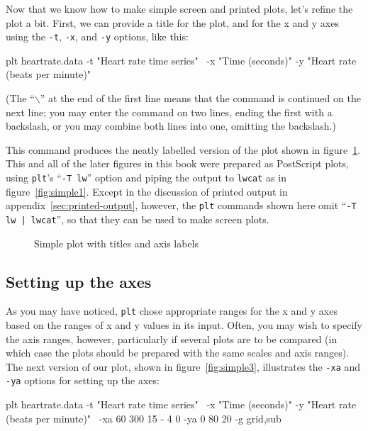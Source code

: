 \documentclass{book}
\begin{document}
Now that we know how to make simple screen and printed plots, let's
refine the plot a bit.  First, we can provide a title for the plot,
and for the x and y axes using the {\tt -t}, {\tt -x}, and {\tt -y}
options, like this:

\begin{center}
\begin{boxedverbatim}
plt heartrate.data -t "Heart rate time series" \
  -x "Time (seconds)" -y "Heart rate (beats per minute)"
\end{boxedverbatim}
\end{center}

\noindent
(The ``{\tt $\backslash$}'' at the end of the first line means that the
command is continued on the next line; you may enter the command on
two lines, ending the first with a backslash, or you may combine both
lines into one, omitting the backslash.)

This command produces the neatly labelled version of the plot shown in
figure~\ref{fig:simple2}.  This and all of the later figures in this
book were prepared as PostScript plots, using {\tt plt}'s ``{\tt -T
lw}'' option and piping the output to {\tt lwcat} as in
figure~\ref{fig:simple1}.  Except in the discussion of printed output in
appendix~\ref{sec:printed-output}, however, the {\tt plt} commands
shown here omit ``{\tt -T lw | lwcat}'', so that they can be
used to make screen plots.

\begin{figure}
\begin{center}
\caption{Simple plot with titles and axis labels \label{fig:simple2}}
\end{center}
\end{figure}

\subsection{Setting up the axes}

As you may have noticed, {\tt plt} chose appropriate ranges for the x
and y axes based on the ranges of x and y values in its input.  Often,
you may wish to specify the axis ranges, however, particularly if
several plots are to be compared (in which case the plots should be
prepared with the same scales and axis ranges).  The next version of
our plot, shown in figure~\ref{fig:simple3}, illustrates the {\tt -xa}
and {\tt -ya} options for setting up the axes:

\begin{center}
\begin{boxedverbatim}
plt heartrate.data -t "Heart rate time series" \
  -x "Time (seconds)" -y "Heart rate (beats per minute)" \
  -xa 60 300 15 - 4 0 -ya 0 80 20 -g grid,sub
\end{boxedverbatim}
\end{center}
\end{document}
